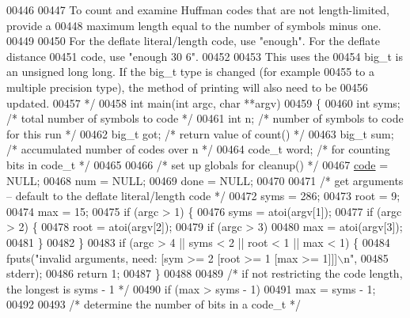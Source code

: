 \begin{DoxyCode}
{{{00446 \textcolor{comment}{}
00447 \textcolor{comment}{   To count and examine Huffman codes that are not length-limited, provide a}
00448 \textcolor{comment}{   maximum length equal to the number of symbols minus one.}
00449 \textcolor{comment}{}
00450 \textcolor{comment}{   For the deflate literal/length code, use "enough".  For the deflate distance}
00451 \textcolor{comment}{   code, use "enough 30 6".}
00452 \textcolor{comment}{}
00453 \textcolor{comment}{   This uses the %
00454 \textcolor{comment}{   big\_t is an unsigned long long.  If the big\_t type is changed (for example}
00455 \textcolor{comment}{   to a multiple precision type), the method of printing will also need to be}
00456 \textcolor{comment}{   updated.}
00457 \textcolor{comment}{ */}
00458 \textcolor{keywordtype}{int} main(\textcolor{keywordtype}{int} argc, \textcolor{keywordtype}{char} **argv)
00459 \{
00460     \textcolor{keywordtype}{int} syms;           \textcolor{comment}{/* total number of symbols to code */}
00461     \textcolor{keywordtype}{int} n;              \textcolor{comment}{/* number of symbols to code for this run */}
00462     big\_t got;          \textcolor{comment}{/* return value of count() */}
00463     big\_t sum;          \textcolor{comment}{/* accumulated number of codes over n */}
00464     code\_t word;        \textcolor{comment}{/* for counting bits in code\_t */}
00465 
00466     \textcolor{comment}{/* set up globals for cleanup() */}
00467     \hyperlink{structcode}{code} = NULL;
00468     num = NULL;
00469     done = NULL;
00470 
00471     \textcolor{comment}{/* get arguments -- default to the deflate literal/length code */}
00472     syms = 286;
00473     root = 9;
00474     max = 15;
00475     \textcolor{keywordflow}{if} (argc > 1) \{
00476         syms = atoi(argv[1]);
00477         \textcolor{keywordflow}{if} (argc > 2) \{
00478             root = atoi(argv[2]);
00479             \textcolor{keywordflow}{if} (argc > 3)
00480                 max = atoi(argv[3]);
00481         \}
00482     \}
00483     \textcolor{keywordflow}{if} (argc > 4 || syms < 2 || root < 1 || max < 1) \{
00484         fputs(\textcolor{stringliteral}{"invalid arguments, need: [sym >= 2 [root >= 1 [max >= 1]]]\(\backslash\)n"},
00485               stderr);
00486         \textcolor{keywordflow}{return} 1;
00487     \}
00488 
00489     \textcolor{comment}{/* if not restricting the code length, the longest is syms - 1 */}
00490     \textcolor{keywordflow}{if} (max > syms - 1)
00491         max = syms - 1;
00492 
00493     \textcolor{comment}{/* determine the number of bits in a code\_t */}
}}}}
\end{DoxyCode}
